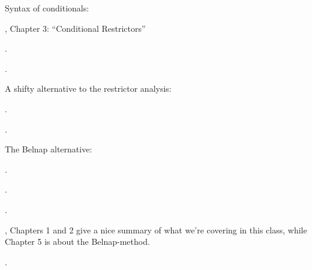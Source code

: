 {Syntax of conditionals:
\begin{bibentrylist}
  \item {}, Chapter 3: ``Conditional Restrictors''
  \item {}.
	\item {}.
\end{bibentrylist}

A shifty alternative to the restrictor analysis:

\begin{bibentrylist}
  \item {}.
  \item {}.
\end{bibentrylist}

The Belnap alternative:

\begin{bibentrylist}
   \item {}.
   \item {}.
   \item {}.
   \item {}, Chapters 1 and 2 give a nice summary of what we're covering in this class, while Chapter 5 is about the Belnap-method.
   \item {}.
\end{bibentrylist}
  

}


